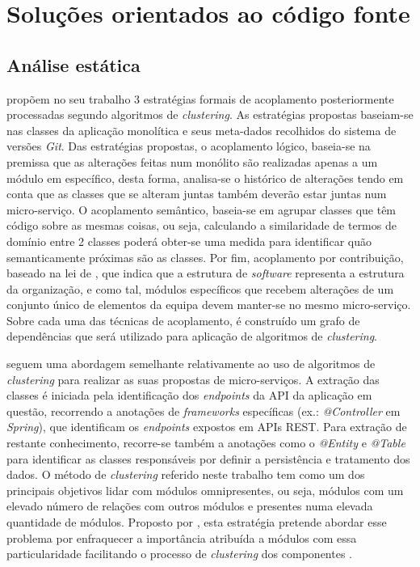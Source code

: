 \section{Soluções orientados ao código fonte}


\subsection{Análise estática}
    
    \cite{mazlami17} propõem no seu trabalho 3 estratégias formais de acoplamento posteriormente processadas segundo algoritmos de \textit{clustering}. As estratégias propostas baseiam-se nas classes da aplicação monolítica e seus meta-dados recolhidos do sistema de versões \textit{Git}. 
    Das estratégias propostas, o acoplamento lógico, baseia-se na premissa que as alterações feitas num monólito são realizadas apenas a um módulo em específico, desta forma, analisa-se o histórico de alterações tendo em conta que as classes que se alteram juntas também deverão estar juntas num micro-serviço. O acoplamento semântico, baseia-se em agrupar classes que têm código sobre as mesmas coisas, ou seja, calculando a similaridade de termos de domínio entre 2 classes poderá obter-se uma medida para identificar quão semanticamente próximas são as classes. Por fim, acoplamento por contribuição, baseado na lei de \cite{conwayslaw}, que indica que a estrutura de \textit{software} representa a estrutura da organização, e como tal, módulos específicos que recebem alterações de um conjunto único de elementos da equipa devem manter-se no mesmo micro-serviço. Sobre cada uma das técnicas de acoplamento, é construído um grafo de dependências que será utilizado para aplicação de algoritmos de \textit{clustering}. 
    
    
    \cite{kamimura18_city_analogy} seguem uma abordagem semelhante relativamente ao uso de algoritmos de \textit{clustering} para realizar as suas propostas de micro-serviços. A extração das classes é iniciada pela identificação dos \textit{endpoints} da API da aplicação em questão, recorrendo a anotações de \textit{frameworks} específicas (ex.: \textit{@Controller} em \textit{Spring}), que identificam os \textit{endpoints} expostos em APIs REST. Para extração de restante conhecimento, recorre-se também a anotações como o \textit{@Entity} e \textit{@Table} para identificar as classes responsáveis por definir a persistência e tratamento dos dados. O método de \textit{clustering} referido neste trabalho tem como um dos principais objetivos lidar com módulos omnipresentes, ou seja, módulos com um elevado número de relações com outros módulos e presentes numa elevada quantidade de módulos. Proposto por \cite{kobayashi12_feature_gathering_software_clustering}, esta estratégia pretende abordar esse problema por enfraquecer a importância atribuída a módulos com essa particularidade facilitando o processo de \textit{clustering} dos componentes \citep{kobayasi13_sarf}.
    
